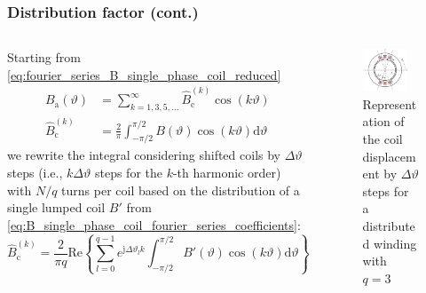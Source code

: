 \begin{frame}
	\frametitle{Distribution factor  (cont.)}
    \begin{columns}
		\begin{column}{0.55\textwidth}
	        Starting from \eqref{eq:fourier_series_B_single_phase_coil_reduced}
            \begin{align*}
                B_\mathrm{a}(\vartheta) &= \sum_{k=1,3,5,\ldots}^{\infty} \hat{B}_{\mathrm{c}}^{(k)} \cos(k \vartheta)\\ \hat{B}_{\mathrm{c}}^{(k)} &= \frac{2}{\pi} \int_{-\pi/2}^{\pi/2} B(\vartheta) \cos(k \vartheta) \mathrm{d}\vartheta
            \end{align*}
            we rewrite the integral considering shifted coils by $\Delta \vartheta$ steps (i.e., $k \Delta \vartheta$ steps for the $k$-th harmonic order) with $N/q$ turns per coil based on the distribution of a single lumped coil $B'$ from \eqref{eq:B_single_phase_coil_fourier_series_coefficients}:
            \begin{equation*}
                \hat{B}_{\mathrm{c}}^{(k)} = \frac{2}{\pi q} \mathrm{Re}\left\{\sum_{l=0}^{q-1}e^{\mathrm{j} \Delta\vartheta_l k}\int_{-\pi/2}^{\pi/2} B'(\vartheta) \cos(k \vartheta) \mathrm{d}\vartheta\right\}.
            \end{equation*}
        \end{column}
        \begin{column}{0.45\textwidth}
            \begin{figure}
                \centering
                \includegraphics[width=0.8\textwidth]{fig/lec05/MMF_single_phase_distributed.pdf}
                \caption{Representation of the coil displacement by $\Delta \vartheta$ steps for a distributed winding with $q=3$}
                \label{fig:MMF_single_phase_distributed}
            \end{figure}
        \end{column}
    \end{columns}
\end{frame}

